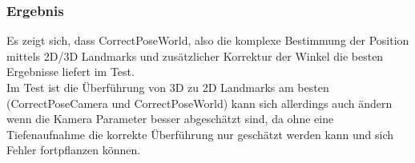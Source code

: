 \subsubsection{Ergebnis}
Es zeigt sich, dass CorrectPoseWorld, also die komplexe Bestimmung der Position mittels 2D/3D Landmarks und zusätzlicher Korrektur der Winkel die besten Ergebnisse liefert im Test.\\
Im Test ist die Überführung von 3D zu 2D Landmarks am besten (CorrectPoseCamera und CorrectPoseWorld) kann sich allerdings auch ändern wenn die Kamera Parameter besser abgeschätzt sind, da ohne eine Tiefenaufnahme die korrekte Überführung nur geschätzt werden kann und sich Fehler fortpflanzen können.